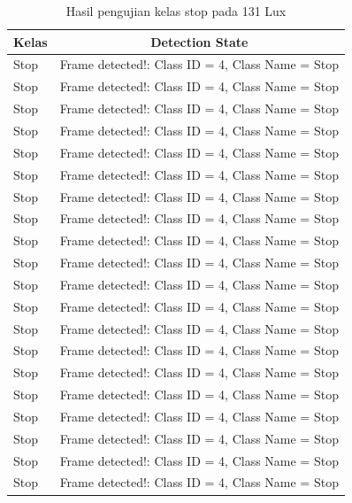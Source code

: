\begin{longtable}{|l|c|}
  \caption{Hasil pengujian kelas stop pada 131 Lux}
  \label{tb:lux131stop} \\
  \hline
  \rowcolor[HTML]{C0C0C0} 
  \textbf{Kelas} & \textbf{Detection State}                           \\ \hline
  Stop           & Frame detected!: Class ID = 4, Class Name = Stop \\ \hline
  Stop           & Frame detected!: Class ID = 4, Class Name = Stop \\ \hline
  Stop           & Frame detected!: Class ID = 4, Class Name = Stop \\ \hline
  Stop           & Frame detected!: Class ID = 4, Class Name = Stop \\ \hline
  Stop           & Frame detected!: Class ID = 4, Class Name = Stop \\ \hline
  Stop           & Frame detected!: Class ID = 4, Class Name = Stop \\ \hline
  Stop           & Frame detected!: Class ID = 4, Class Name = Stop \\ \hline
  Stop           & Frame detected!: Class ID = 4, Class Name = Stop \\ \hline
  Stop           & Frame detected!: Class ID = 4, Class Name = Stop \\ \hline
  Stop           & Frame detected!: Class ID = 4, Class Name = Stop \\ \hline
  Stop           & Frame detected!: Class ID = 4, Class Name = Stop \\ \hline
  Stop           & Frame detected!: Class ID = 4, Class Name = Stop \\ \hline
  Stop           & Frame detected!: Class ID = 4, Class Name = Stop \\ \hline
  Stop           & Frame detected!: Class ID = 4, Class Name = Stop \\ \hline
  Stop           & Frame detected!: Class ID = 4, Class Name = Stop \\ \hline
  Stop           & Frame detected!: Class ID = 4, Class Name = Stop \\ \hline
  Stop           & Frame detected!: Class ID = 4, Class Name = Stop \\ \hline
  Stop           & Frame detected!: Class ID = 4, Class Name = Stop \\ \hline
  Stop           & Frame detected!: Class ID = 4, Class Name = Stop \\ \hline
  Stop           & Frame detected!: Class ID = 4, Class Name = Stop \\ \hline

\end{longtable}
